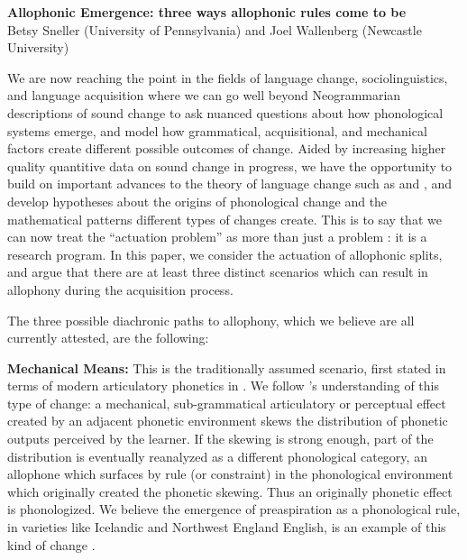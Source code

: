 \documentclass[a4paper,aps,prl,12pt,tightenlines,superscriptaddress]{revtex4}
\title{}
\begin{document}
\begin{center} \textbf{Allophonic Emergence: three ways allophonic rules come to be} \\

Betsy Sneller (University of Pennsylvania) and Joel Wallenberg (Newcastle University)
 \end{center}



We are now reaching the point in the fields of language change, sociolinguistics, and language acquisition where we can go well beyond Neogrammarian descriptions of sound change to ask nuanced questions about how phonological systems emerge, and model how grammatical, acquisitional, and mechanical factors create different possible outcomes of change. Aided by increasing higher quality quantitive data on sound change in progress, we have the opportunity to build on important advances to the theory of language change such as \citet{kiparsky1995b} and \citet{labov1994}, and develop hypotheses about the origins of phonological change and the mathematical patterns different types of changes create. This is to say that we can now treat the ``actuation problem'' as more than just a problem \citep{wlh1968}: it is a research program. In this paper, we consider the actuation of allophonic splits, and argue that there are at least three distinct scenarios which can result in allophony during the acquisition process.

The three possible diachronic paths to allophony, which we believe are all currently attested, are the following:

\textbf{Mechanical Means:} This is the traditionally assumed scenario, first stated in terms of modern articulatory phonetics in \citet{ohala1983, ohala1989}. We follow \citet[][and previous work]{bermudezotero2014}'s understanding of this type of change: a mechanical, sub-grammatical articulatory or perceptual effect created by an adjacent phonetic environment skews the distribution of phonetic outputs perceived by the learner. If the skewing is strong enough, part of the distribution is eventually reanalyzed as a different phonological category, an allophone which surfaces by rule (or constraint) in the phonological environment which originally created the phonetic skewing. Thus an originally phonetic effect is phonologized. We believe the emergence of preaspiration as a phonological rule, in varieties like Icelandic and Northwest England English, is an example of this kind of change \citep{Hejna2014}.
\end{document}

